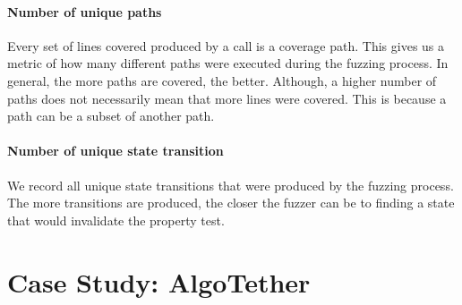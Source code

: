 \paragraph{Number of unique paths} Every set of lines covered produced by a call is a coverage path.
This gives us a metric of how many different paths were executed during the fuzzing process.
In general, the more paths are covered, the better.
Although, a higher number of paths does not necessarily mean that more lines were covered.
This is because a path can be a subset of another path.

\paragraph{Number of unique state transition} We record all unique state transitions that were produced by the fuzzing process.
The more transitions are produced, the closer the fuzzer can be to finding a state that would invalidate the property test.




\section{Case Study: AlgoTether}
